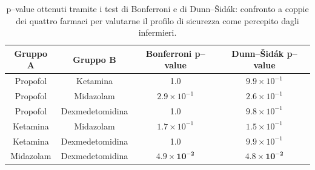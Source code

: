 \bgroup
\def\arraystretch{1.5}
\begin{table}[!h]
    \centering
    \begin{tabular}{c|c|c|c}
         Gruppo A & Gruppo B & Bonferroni p--value & Dunn--Šidák p--value\\ \hline
       Propofol & Ketamina & 1.0 & $9.9 \times 10^{-1}$ \\
       Propofol & Midazolam  & $2.9 \times 10^{-1}$ & $2.6 \times 10^{-1}$\\
       Propofol & Dexmedetomidina & 1.0 & $9.8 \times 10^{-1}$\\
       Ketamina & Midazolam & $1.7\times10^{-1}$ & $1.5\times10^{-1}$\\
       Ketamina & Dexmedetomidina & 1.0 & $9.9\times10^{-1}$\\
       Midazolam & Dexmedetomidina & $\mathbf{4.9 \times 10^{-2}}$ & $\mathbf{4.8 \times 10^{-2}}$\\
       
    \end{tabular}
    \caption{p--value ottenuti tramite i test di Bonferroni e di Dunn--Šidák: confronto a coppie dei quattro farmaci per valutarne il profilo di sicurezza come percepito dagli infermieri.} %
    \label{tab:sicurezzatest}
\end{table}
\egroup

\vfill

